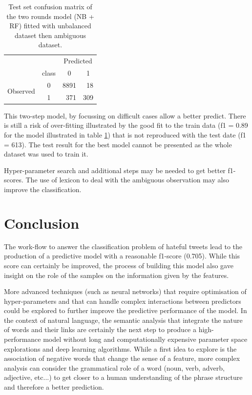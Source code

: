 \documentclass[a4paper]{tufte-handout}
\begin{document}
\begin{fullwidth}
\begin{table}[]\label{final}
\begin{center}
\begin{tabular}{llcr}
                                              &                            & \multicolumn{2}{c}{Predicted}                    \\
                                              & \multicolumn{1}{l|}{class} & 0                        & \multicolumn{1}{c}{1} \\ \cline{2-4} 
\multicolumn{1}{c}{\multirow{2}{*}{Observed}} & \multicolumn{1}{c|}{0}     & \multicolumn{1}{r}{8891} & 18                  \\
\multicolumn{1}{c}{}                          & \multicolumn{1}{c|}{1}     & \multicolumn{1}{r}{371  }   & 309                  
\end{tabular}
\caption{Test set confusion matrix of the two rounds model (NB + RF) fitted with unbalanced dataset then ambiguous dataset.}
\end{center}
\end{table}

This two-step model, by focussing on difficult cases allow a better predict. There is still a risk of over-fitting illustrated by the good fit to the train data (f1 = 0.89 for the model illustrated in table \ref{final}) that is not reproduced with the test date (f1 = 613). The test result for the best model cannot be presented as the whole dataset was used to train it.

Hyper-parameter search and additional steps may be needed to get better f1-scores. The use of lexicon to deal with the ambiguous observation may also improve the classification.


\section{Conclusion}

The work-flow to answer the classification problem of hateful tweets lead to the production of a predictive model with a reasonable f1-score (0.705). While this score can certainly be improved, the process of building this model also gave insight on the role of the samples on the information given by the features.

More advanced techniques (such as neural networks) that require optimisation of hyper-parameters and that can handle complex interactions between predictors could be explored to further improve the predictive performance of the model. In the context of natural language, the semantic analysis that integrate the nature of words and their links are certainly the next step to produce a high-performance model without long and computationally expensive parameter space explorations and deep learning algorithms. While a first idea to explore is the association of negative words that change the sense of a feature, more complex analysis can consider the grammatical role of a word (noun, verb, adverb, adjective, etc...) to get closer to a human understanding of the phrase structure and therefore a better prediction.


\end{fullwidth}
\end{document}

